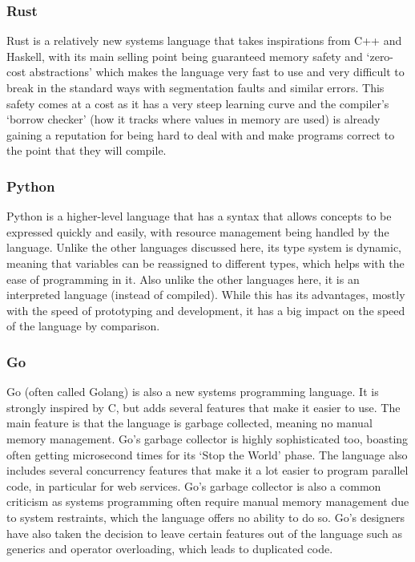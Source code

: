 \subsubsection{Rust}
Rust is a relatively new systems language that takes inspirations from C++ and
Haskell, with its main selling point being guaranteed memory safety and
`zero-cost abstractions' which makes the language very fast to use and very
difficult to break in the standard ways with segmentation faults and similar
errors. This safety comes at a cost as it has a very steep learning curve and
the compiler's `borrow checker' (how it tracks where values in memory are used)
is already gaining a reputation for being hard to deal with and make programs
correct to the point that they will compile.

\subsubsection{Python}
Python is a higher-level language that has a syntax that allows concepts to be
expressed quickly and easily, with resource management being handled by the
language. Unlike the other languages discussed here, its type system is dynamic,
meaning that variables can be reassigned to different types, which helps with
the ease of programming in it. Also unlike the other languages here, it is an
interpreted language (instead of compiled). While this has its advantages,
mostly with the speed of prototyping and development, it has a big impact on the
speed of the language by comparison.

\subsubsection{Go}
Go (often called Golang) is also a new systems programming language. It is
strongly inspired by C, but adds several features that make it easier to use.
The main feature is that the language is garbage collected, meaning no manual
memory management. Go's garbage collector is highly sophisticated too, boasting
often getting microsecond times for its `Stop the World' phase. The language
also includes several concurrency features that make it a lot easier to program
parallel code, in particular for web services. Go's garbage collector is also a
common criticism as systems programming often require manual memory management
due to system restraints, which the language offers no ability to do so. Go's
designers have also taken the decision to leave certain features out of the
language such as generics and operator overloading, which leads to duplicated
code.

